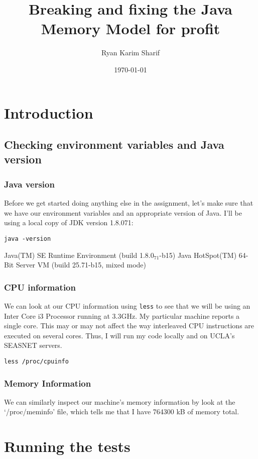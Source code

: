 \documentclass[11pt]{article}
\author{Ryan Karim Sharif}
\date{\today}
\title{Breaking and fixing the Java Memory Model for profit}
\begin{document}
\maketitle
\tableofcontents


\section{Introduction}
\label{sec-1}
\subsection{Checking environment variables and Java version}
\label{sec-1-1}
\subsubsection{Java version}
\label{sec-1-1-1}
Before we get started doing anything else in the assignment,
let's make sure that we have our environment variables and
an appropriate version of Java. I'll be using a local copy
of JDK version 1.8.071:

\begin{verbatim}
java -version
\end{verbatim}
Java(TM) SE Runtime Environment (build 1.8.0$_{\text{71}}$-b15)
Java HotSpot(TM) 64-Bit Server VM (build 25.71-b15, mixed mode)
\subsubsection{CPU information}
\label{sec-1-1-2}
We can look at our CPU information using \verb~less~ to see that we will
be using an Inter Core i3 Processor running at 3.3GHz. My particular
machine reports a single core. This may or may not affect the way
interleaved CPU instructions are executed on several cores. Thus,
I will run my code locally and on UCLA's SEASNET servers. 

\begin{verbatim}
less /proc/cpuinfo
\end{verbatim}
\subsubsection{Memory Information}
\label{sec-1-1-3}
We can similarly inspect our machine's memory information by look at
the `/proc/meminfo' file, which tells me that I have 764300 kB of
memory total.
\section{Running the tests}
\label{sec-2}
\end{document}
